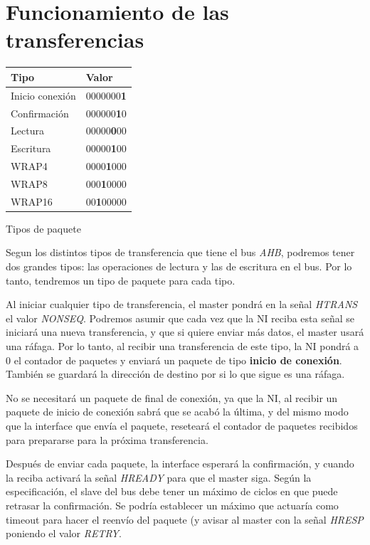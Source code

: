 \documentclass[a4paper, 12pt, babel, spanish]{article}
\begin{document}
\section*{Funcionamiento de las transferencias} 

\begin{floatingtable}[r]{
\begin{tabularx}{0.45\textwidth}{l X}
\toprule
\textbf{Tipo} 	& \textbf{Valor} \\ \midrule
Inicio conexión & 0000000\textbf{1} \\ \midrule
Confirmación 	& 000000\textbf{1}0 \\ \midrule
Lectura			& 00000\textbf{0}00 \\ \midrule
Escritura		& 00000\textbf{1}00 \\ \midrule
WRAP4			& 0000\textbf{1}000 \\ \midrule
WRAP8			& 000\textbf{1}0000 \\ \midrule
WRAP16			& 00\textbf{1}00000 \\
\bottomrule
\end{tabularx}}
\caption{Tipos de paquete}
\end{floatingtable}

Segun los distintos tipos de transferencia que tiene el bus \emph{AHB}, podremos tener dos grandes tipos: las operaciones de lectura y las de escritura en el bus. Por lo tanto, tendremos un tipo de paquete para cada tipo.

Al iniciar cualquier tipo de transferencia, el master pondrá en la señal \emph{HTRANS} el valor \emph{NONSEQ}. Podremos asumir que cada vez que la NI reciba esta señal se iniciará una nueva transferencia, y que si quiere enviar más datos, el master usará una ráfaga. Por lo tanto, al recibir una transferencia de este tipo, la NI pondrá a 0 el contador de paquetes y enviará un paquete de tipo \textbf{inicio de conexión}. También se guardará la dirección de destino por si lo que sigue es una ráfaga.

No se necesitará un paquete de final de conexión, ya que la NI, al recibir un paquete de inicio de conexión sabrá que se acabó la última, y del mismo modo que la interface que envía el paquete, reseteará el contador de paquetes recibidos para prepararse para la próxima transferencia.

Después de enviar cada paquete, la interface esperará la confirmación, y cuando la reciba activará la señal \emph{HREADY} para que el master siga. Según la especificación, el slave del bus debe tener un máximo de ciclos en que puede retrasar la confirmación. Se podría establecer un máximo que actuaría como timeout para hacer el reenvío del paquete (y avisar al master con la señal \emph{HRESP} poniendo el valor \emph{RETRY}.
\end{document}

